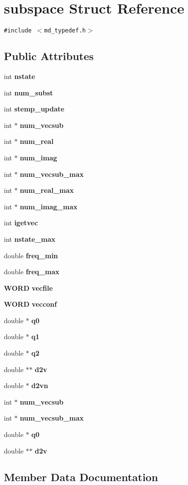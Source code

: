 \section{subspace Struct Reference}
\label{structsubspace}
{\tt \#include $<$md\_\-typedef.h$>$}

\subsection*{Public Attributes}
\begin{CompactItemize}
\item 
int {\bf nstate}
\item 
int {\bf num\_\-subst}
\item 
int {\bf stemp\_\-update}
\item 
int $\ast$ {\bf num\_\-vecsub}
\item 
int $\ast$ {\bf num\_\-real}
\item 
int $\ast$ {\bf num\_\-imag}
\item 
int $\ast$ {\bf num\_\-vecsub\_\-max}
\item 
int $\ast$ {\bf num\_\-real\_\-max}
\item 
int $\ast$ {\bf num\_\-imag\_\-max}
\item 
int {\bf igetvec}
\item 
int {\bf nstate\_\-max}
\item 
double {\bf freq\_\-min}
\item 
double {\bf freq\_\-max}
\item 
{\bf WORD} {\bf vecfile}
\item 
{\bf WORD} {\bf vecconf}
\item 
double $\ast$ {\bf q0}
\item 
double $\ast$ {\bf q1}
\item 
double $\ast$ {\bf q2}
\item 
double $\ast$$\ast$ {\bf d2v}
\item 
double $\ast$ {\bf d2vn}
\item 
int $\ast$ {\bf num\_\-vecsub}
\item 
int $\ast$ {\bf num\_\-vecsub\_\-max}
\item 
double $\ast$ {\bf q0}
\item 
double $\ast$$\ast$ {\bf d2v}
\end{CompactItemize}


\subsection{Member Data Documentation}
